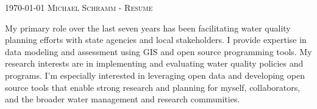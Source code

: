\documentclass[localFont, alternative, showLinks, 11pt,
compact]{yaac-another-awesome-cv}
\begin{document}
	\makecvheader

	\makecvfooter
		{\textsc{\today}}
		{\textsc{Michael Schramm - Resume}}
		{\thepage}

My primary role over the last seven years has been facilitating water
quality planning efforts with state agencies and local stakeholders. I
provide expertise in data modeling and assessment using GIS and open
source programming tools. My research interests are in implementing and
evaluating water quality policies and programs. I'm especially
interested in leveraging open data and developing open source tools that
enable strong research and planning for myself, collaborators, and the
broader water management and research communities.


\begin{keywords}   \end{keywords}

\end{document}
